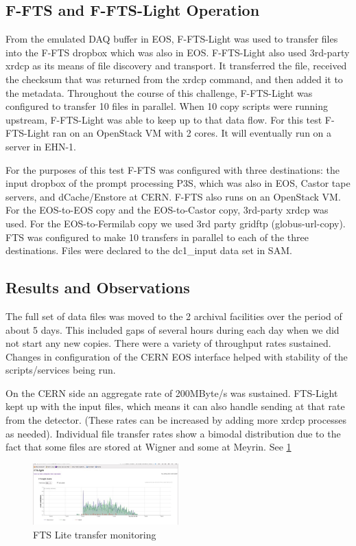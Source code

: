 \documentclass[pdftex,12pt,letter]{article}
\begin{document}
\subsection{F-FTS and F-FTS-Light Operation}
From the emulated DAQ buffer in EOS, F-FTS-Light was used to transfer files into the F-FTS dropbox which was also in EOS.  F-FTS-Light also used 3rd-party xrdcp as its means of file discovery and transport.  It transferred the file, received the checksum that was returned from the xrdcp command, and then added it to the metadata.  Throughout the course of this challenge, F-FTS-Light was configured to transfer 10 files in parallel.   When 10 copy scripts were running upstream, F-FTS-Light was able to keep up to that data flow.  For this test F-FTS-Light ran on an OpenStack VM with 2 cores.  It will eventually run on a server in EHN-1.

For the purposes of this test F-FTS was configured with three destinations:  the input dropbox of the prompt processing P3S, which was also in EOS, Castor tape servers, and dCache/Enstore at CERN.  F-FTS also runs on an OpenStack VM.
For the EOS-to-EOS copy and the EOS-to-Castor copy, 3rd-party xrdcp was used.  For the EOS-to-Fermilab copy we used 3rd party gridftp (globus-url-copy).
FTS was configured to make 10 transfers in parallel to each of the three destinations. Files were declared to the dc1\_input data set in SAM.



\subsection{Results and Observations}
The full set of data files was moved to the 2 archival facilities over the period of about 5 days.  This included gaps of several hours during each day when we did not start any new copies. There were a variety of throughput rates sustained. Changes in configuration of the CERN EOS interface helped with stability of the scripts/services being run. 

On the CERN side an aggregate rate of 200MByte/s was sustained. FTS-Light kept up with the input files, which means it can also handle sending at that rate from the detector. (These rates can be increased by adding more xrdcp processes as needed). Individual file transfer rates show a bimodal distribution due to the fact that some files are stored at Wigner and some at Meyrin.  See \ref{fig:FTSLite}


\begin{figure}[tbh]
  \centering
  \includegraphics[width=0.5\textwidth]{./ReportImages/FTSLite.jpg}
  \caption{FTS Lite transfer monitoring}
  \label{fig:FTSLite}
\end{figure}
\end{document}
